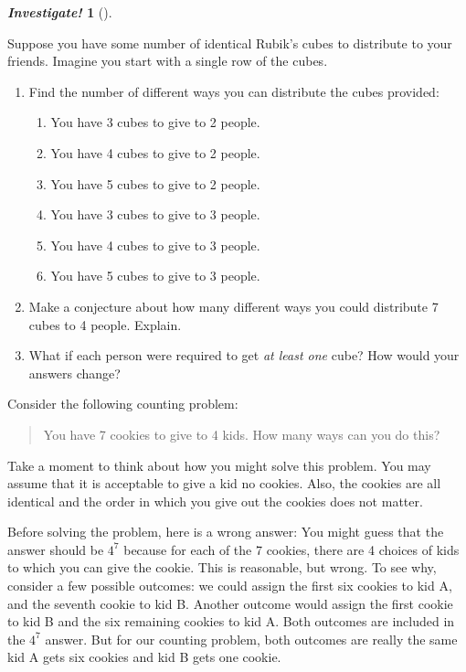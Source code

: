 \documentclass[10pt,]{book}
\theoremstyle{plain}
\theoremstyle{definition}
\theoremstyle{definition}
\newtheorem{investigation}[project]{\emph{Investigate!}}
\theoremstyle{definition}
\numberwithin{equation}{section}
\begin{document}
%
\begin{investigation}[]\label{investigation-10}

  Suppose you have some number of identical Rubik's cubes to distribute to your friends. Imagine you start with a single row of the cubes.


\leavevmode%
\begin{enumerate}
\item\hypertarget{li-557}{}
 Find the number of different ways you can distribute the cubes provided:
%
%
\begin{enumerate}
\item\hypertarget{li-558}{}
You have 3 cubes to give to 2 people.
%
\item\hypertarget{li-559}{}
You have 4 cubes to give to 2 people.
%
\item\hypertarget{li-560}{}
You have 5 cubes to give to 2 people.
%
\item\hypertarget{li-561}{}
You have 3 cubes to give to 3 people.
%
\item\hypertarget{li-562}{}
You have 4 cubes to give to 3 people.
%
\item\hypertarget{li-563}{}
You have 5 cubes to give to 3 people.
%
\end{enumerate}
\item\hypertarget{li-564}{}
Make a conjecture about how many different ways you could distribute 7 cubes to 4 people. Explain.
%
\item\hypertarget{li-565}{}
What if each person were required to get \emph{at least one} cube? How would your answers change?
%
\end{enumerate}

%
\end{investigation}
\par

Consider the following counting problem:
%
\begin{quote}
You have 7 cookies to give to 4 kids.  How many ways can you do this?
\end{quote}
\par

Take a moment to think about how you might solve this problem. You may assume that it is acceptable to give a kid no cookies. Also, the cookies are all identical and the order in which you give out the cookies does not matter.
%
\par

Before solving the problem, here is a wrong answer: You might guess that the answer should be \(4^7\) because for each of the 7 cookies, there are 4 choices of kids to which you can give the cookie. This is reasonable, but wrong. To see why, consider a few possible outcomes: we could assign the first six cookies to kid A, and the seventh cookie to kid B. Another outcome would assign the first cookie to kid B and the six remaining cookies to kid A. Both outcomes are included in the \(4^7\) answer. But for our counting problem, both outcomes are really the same \textendash{} kid A gets six cookies and kid B gets one cookie.
%
\par
\end{document}
